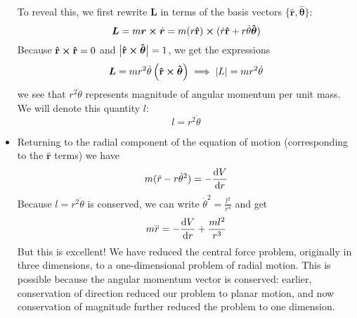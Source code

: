 \documentclass[11pt, a4paper]{article}
\newcommand{\bdot}[1]{\dot{\bm{#1}}} %
\newcommand{\uvec}[1]{\bm{\hat{\mathbf{#1}}}} %
\begin{document}
\begin{itemize}
	To reveal this, we first rewrite $ \bm{L} $ in terms of the basis vectors $ \{\uvec{r}, \uvec{\theta} \}$:
	\begin{equation*}
		\bm{L} = m \bm{r} \cross \bdot{r} = m (r\uvec{r}) \cross (\dot{r} \uvec{r} + r \dot{\theta} \uvec{\theta})
	\end{equation*}	
	Because $ \uvec{r} \cross \uvec{r} = 0 $ and $ \big |\uvec{r} \cross \uvec{\theta}\big | = 1 $, we get the expressions
	\begin{equation*}
		\bm{L} = m r^{2} \dot{\theta} \left (\uvec{r} \cross \uvec{\theta}\right ) \implies \abs{L} = mr^{2} \dot{\theta}
	\end{equation*}	
	we see that $ r^{2}\dot{\theta} $ represents magnitude of angular momentum per unit mass. We will denote this quantity $ l $:
	\begin{equation*}
		l = r^{2} \dot{\theta}
	\end{equation*}
	
	\item Returning to the radial component of the equation of motion (corresponding to the $ \uvec{r} $ terms) we have
	\begin{equation*}
		m(\ddot{r} - r \dot{\theta}^{2}) = - \dv{V}{r}
	\end{equation*}
	Because $ l = r^{2} \dot{\theta} $ is conserved, we can write $ \dot{\theta}^{2} = \frac{l^{2}}{r^{4}} $ and get
	\begin{equation*}
		m \ddot{r} = - \dv{V}{r} + \frac{ml^{2}}{r^{3}}
	\end{equation*}
	But this is excellent! We have reduced the central force problem, originally in three dimensions, to a one-dimensional problem of radial motion. This is possible because the angular momentum vector is conserved: earlier, conservation of direction reduced our problem to planar motion, and now conservation of magnitude further reduced the problem to one dimension. 

\end{itemize}
\end{document}
